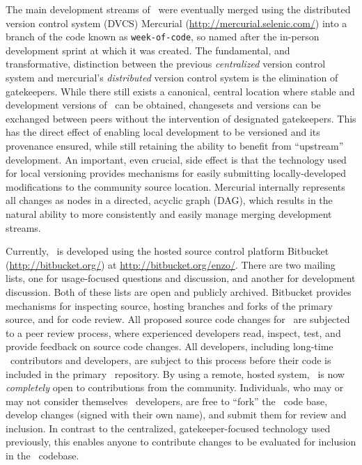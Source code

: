 The main development streams of \enzo\ were eventually merged using
the distributed version control system (DVCS) Mercurial
(\url{http://mercurial.selenic.com/}) into a branch of the code known
as \texttt{week-of-code}, so named after the in-person development
sprint at which it was created.  The fundamental, and transformative,
distinction between the previous \textit{centralized} version control
system and mercurial's \textit{distributed} version control system is
the elimination of gatekeepers.  While there still exists a canonical,
central location where stable and development versions of \enzo\ can
be obtained, changesets and versions can be exchanged between peers
without the intervention of designated gatekeepers.  This has the
direct effect of enabling local development to be versioned and its
provenance ensured, while still retaining the ability to benefit from
``upstream'' development.  An important, even crucial, side effect is
that the technology used for local versioning provides mechanisms for
easily submitting locally-developed modifications to the community
source location.  Mercurial internally represents all changes as nodes
in a directed, acyclic graph (DAG), which results in the natural
ability to more consistently and easily manage merging development
streams.

Currently, \enzo\ is developed using the hosted source control
platform Bitbucket (\url{http://bitbucket.org/}) at
\url{http://bitbucket.org/enzo/}.  There are two mailing lists, one
for usage-focused questions and discussion, and another for
development discussion.  Both of these lists are open and publicly
archived.  Bitbucket provides mechanisms for inspecting source,
hosting branches and forks of the primary source, and for code review.
All proposed source code changes for \enzo\ are subjected to a peer
review process, where experienced developers read, inspect, test, and
provide feedback on source code changes.  All developers, including
long-time \enzo\ contributors and developers, are subject to this
process before their code is included in the primary \enzo\
repository.  By using a remote, hosted system, \enzo\ is now
\textit{completely} open to contributions from the community.
Individuals, who may or may not consider themselves \enzo\ developers,
are free to ``fork'' the \enzo\ code base, develop changes (signed
with their own name), and submit them for review and inclusion.  In
contrast to the centralized, gatekeeper-focused technology used
previously, this enables anyone to contribute changes to be evaluated
for inclusion in the \enzo\ codebase.

